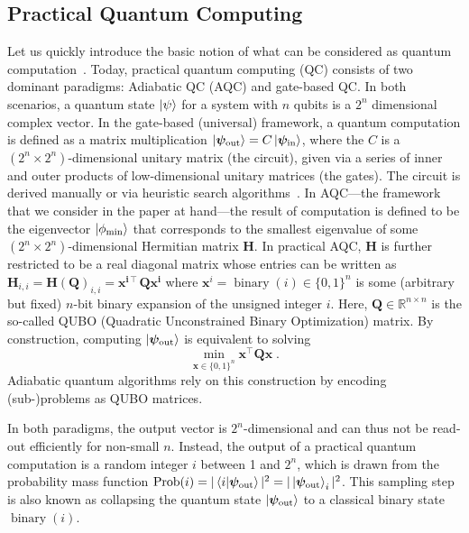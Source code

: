 \documentclass[conference]{IEEEtran}
\makeatletter
\newcommand\todo[1]{\textcolor{red}{TODO: #1}}
\newcommand{\trans}{\intercal}
\renewcommand{\vec}[1]{\bm{#1}}
\newcommand{\mat}[1]{\bm{#1}}
\newcommand{\QUBO}{\textsc{QUBO}\@\xspace}
\makeatother
\begin{document}
\subsection{Practical Quantum Computing} \label{sec:qc}
Let us quickly introduce the basic notion of what can be considered as quantum computation~\cite{Nielsen/Chuang/2016a}. 
Today, practical quantum computing (QC) consists of two dominant paradigms: Adiabatic QC (AQC) and gate-based QC. In both scenarios, a quantum state $\ket{\psi}$ for a system with $n$ qubits is a $2^n$ dimensional complex 
vector. In the gate-based (universal) framework, a quantum computation is defined as a matrix multiplication $\ket{\vec{\psi}_{\text{out}}}=C\ket{\vec{\psi}_{\text{in}}}$, where the $C$ is a $(2^n \times 2^n)$-dimensional unitary matrix (the circuit), given via a 
series of inner and outer products of low-dimensional unitary matrices (the gates). The circuit is derived manually or via heuristic search algorithms~\cite{Franken2022}. In AQC---the
framework that we consider in the paper at hand---the result of computation is defined to be the eigenvector $\ket{\phi_{\min}}$ that corresponds to the smallest eigenvalue of some $(2^n \times 2^n)$-dimensional Hermitian matrix $\mat{H}$. In 
practical AQC, $\mat{H}$ is further restricted to be a real diagonal matrix whose entries can be 
written as $\mat{H}_{i,i}=\mat{H}(\mat{Q})_{i,i}=\boldsymbol{\vec{x}^{i{\trans}} \mat{Q} \vec{x}^i}$ where $\vec{x}^i=\operatorname{binary}(i)\in\{0,1\}^n$ is some (arbitrary but 
fixed) $n$-bit binary expansion of the unsigned integer $i$. Here, $\mat{Q} \in \mathbb{R}^{n\times n}$ is the so-called {\QUBO} (Quadratic Unconstrained Binary Optimization) 
matrix. By construction, computing $\ket{\vec{\psi}_{\text{out}}}$ is equivalent to solving 
\begin{equation}\label{qubo-objective}
	\min_{\vec{x}\in\{0,1\}^n} \vec{x}^{\trans} \mat{Q} \vec{x}\;.
\end{equation}Adiabatic quantum algorithms rely on this construction by encoding (sub-)problems as {\QUBO} matrices. 

In both paradigms, the output vector is $2^n$-dimensional and can thus not be read-out efficiently for non-small $n$. Instead, the output of a practical quantum computation is a random integer $i$ between 1 and $2^n$, which is drawn from the probability mass function $\operatorname{Prob}(i)=|\braket{i | \vec{\psi}_{\text{out}}}|^2=|\ket{\vec{\psi}_{\text{out}}}_i|^2$. This sampling step is also known as collapsing the quantum state $\ket{\vec{\psi}_{\text{out}}}$ to a classical binary state $\operatorname{binary}(i)$.
\end{document}
